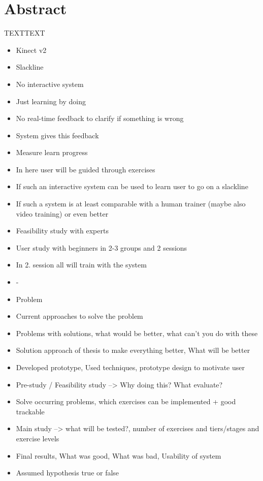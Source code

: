 \section*{Abstract}

TEXTTEXT
\begin{itemize}
\item Kinect v2
\item Slackline
\item No interactive system
\item Just learning by doing
\item No real-time feedback to clarify if something is wrong
\item System gives this feedback
\item Measure learn progress
\item In here user will be guided through exercises
\item If such an interactive system can be used to learn user to go on a slackline
\item If such a system is at least comparable with a human trainer (maybe also video training) or even better
\item Feasibility study with experts
\item User study with beginners in 2-3 groups and 2 sessions
\item In 2. session all will train with the system
\item -
\item Problem
\item Current approaches to solve the problem
\item Problems with solutions, what would be better, what can't you do with these
\item Solution approach of thesis to make everything better, What will be better
\item Developed prototype, Used techniques, prototype design to motivate user
\item Pre-study / Feasibility study --> Why doing this? What evaluate?
\item Solve occurring problems, which exercises can be implemented + good trackable
\item Main study --> what will be tested?, number of exercises and tiers/stages and exercise levels 
\item Final results, What was good, What was bad, Usability of system
\item Assumed hypothesis true or false
\end{itemize}

